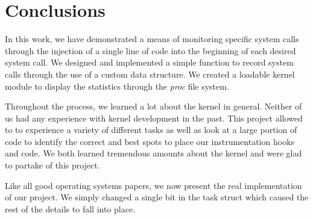 \documentclass[conference]{IEEEtran}
\begin{document}
\section{Conclusions}
\label{sec:conclusions}
In this work, we have demonstrated a means of monitoring specific system calls through the injection of a single line of code into the beginning of each desired system call.
We designed and implemented a simple function to record system calls through the use of a custom data structure.
We created a loadable kernel module to display the statistics through the \textit{proc} file system.

Throughout the process, we learned a lot about the kernel in general.
Neither of us had any experience with kernel development in the past.
This project allowed to to experience a variety of different tasks as well as look at a large portion of code to identify the correct and best spots to place our instrumentation hooks and code.
We both learned tremendous amounts about the kernel and were glad to partake of this project.

Like all good operating systems papers, we now present the real implementation of our project.
We simply changed a single bit in the task struct which caused the rest of the details to fall into place.



%
%
%


\def\V{\rm vol.~}
\def\N{no.~}
\def\pp{pp.~}
\def\Pot{\it Proc. }
\def\IJCNN{\it International Joint Conference on Neural Networks\rm }
\def\ACC{\it American Control Conference\rm }
\def\SMC{\it IEEE Trans. Systems\rm , \it Man\rm , and \it Cybernetics\rm }
\end{document}
